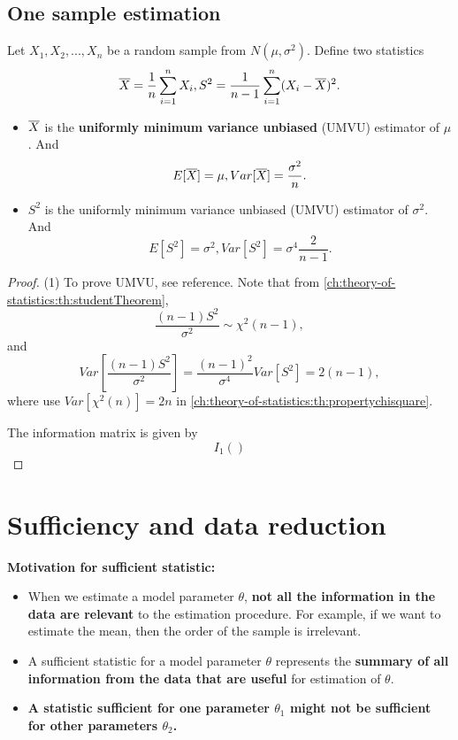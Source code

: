 \begin{refsection}
\subsection{One sample estimation}


\begin{lemma}\cite{sciacchitano2015collaborative}
	Let $X_1,X_2,...,X_n$ be a random sample from $N(\mu, \sigma^2)$. Define two statistics
	$$\overline{X} = \frac{1}{n}\sum_{i=1}^n X_i, S^2 = \frac{1}{n-1}\sum_{i=1}^n (X_i - \overline{X})^2.$$
	\begin{itemize}
		\item $\overline{X}$ is the \textbf{uniformly minimum variance unbiased }(UMVU) estimator of $\mu$. And
		$$E[\overline{X}] = \mu, Var[\overline{X}] = \frac{\sigma^2}{n}.$$
		\item $S^2$ is the uniformly minimum variance unbiased (UMVU) estimator of $\sigma^2$. And
		$$E[S^2] = \sigma^2, Var[S^2] = \sigma^4\frac{2}{n-1}.$$
	\end{itemize}	
\end{lemma}
\begin{proof}
	(1) To prove UMVU, see reference. Note that from \autoref{ch:theory-of-statistics:th:studentTheorem},
	$$\frac{(n-1)S^2}{\sigma^2}\sim \chi^2({n-1}),$$
	and
	$$Var[\frac{(n-1)S^2}{\sigma^2}] = \frac{(n-1)^2}{\sigma^4}Var[S^2] = 2(n-1),$$
	where use $Var[\chi^2(n)] = 2n$ in \autoref{ch:theory-of-statistics:th:propertychisquare}.
	
	The information matrix is given by
	$$I_1()$$
\end{proof}

\section{Sufficiency and data reduction}

\begin{mdframed}
	\textbf{Motivation for sufficient statistic:}\\
	\begin{itemize}
		\item When we estimate a model parameter $\theta$, \textbf{not all the information in the data are relevant} to the estimation procedure. For example, if we want to estimate the mean, then the order of the sample is irrelevant.
		\item A sufficient statistic for a model parameter $\theta$ represents the \textbf{summary of all information from the data that are useful} for estimation of $\theta$.
		\item \textbf{A statistic sufficient for one parameter $\theta_1$ might not be sufficient for other parameters $\theta_2$.}
	\end{itemize}
\end{mdframed}



\end{refsection}
